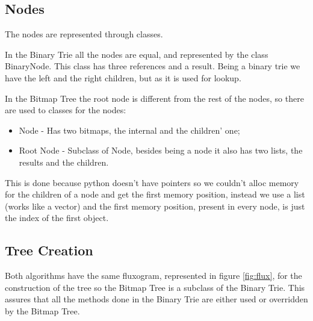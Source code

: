 \documentclass[]{report}
\begin{document}
\subsection{Nodes}
The nodes are represented through classes.

In the Binary Trie all the nodes are equal, and represented by the class BinaryNode. This class has three references and a result. Being a binary trie we have the left and the right children, but as it is used for lookup.

In the Bitmap Tree the root node is different from the rest of the nodes, so there are used to classes for the nodes:
\begin{itemize}
\item Node - Has two bitmaps, the internal and the children’ one;
\item Root Node - Subclass of Node, besides being a node it also has two lists, the results and the children.
\end{itemize}
This is done because python doesn’t have pointers so we couldn’t alloc memory for the children of a node and get the first memory position, instead we use a list (works like a vector) and the first memory position, present in every node, is just the index of the first object.

\subsection{Tree Creation}
Both algorithms have the same fluxogram, represented in figure \ref{fig:flux}, for the construction of the tree so the Bitmap Tree is a subclass of the Binary Trie. This assures that all the methods done in the Binary  Trie are either used or overridden by the Bitmap Tree.

\begin{minipage}{\linewidth}%

\label{fig:flux}
\end{minipage}
\end{document}
